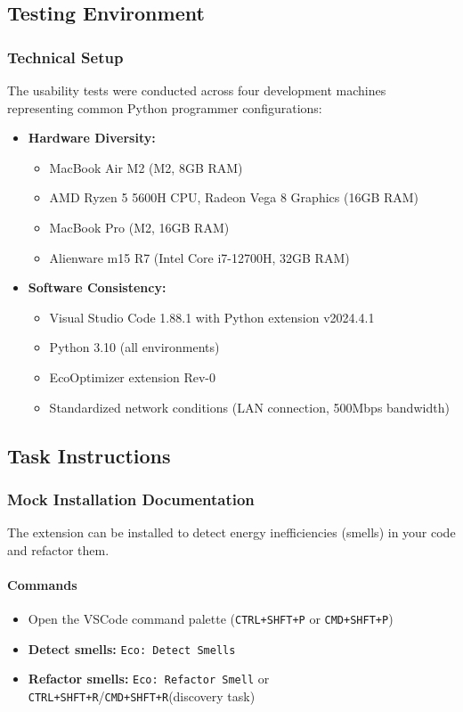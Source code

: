 \documentclass{article}
\begin{document}
\subsection{Testing Environment}
\subsubsection{Technical Setup}
The usability tests were conducted across four development machines representing common Python programmer configurations:

\begin{itemize}
    \item \textbf{Hardware Diversity:}
    \begin{itemize}
        \item MacBook Air M2 (M2, 8GB RAM)
        \item AMD Ryzen 5 5600H CPU, Radeon Vega 8 Graphics (16GB RAM)
        \item MacBook Pro (M2, 16GB RAM)
        \item Alienware m15 R7 (Intel Core i7-12700H, 32GB RAM)
    \end{itemize}
    
    \item \textbf{Software Consistency:}
    \begin{itemize}
        \item Visual Studio Code 1.88.1 with Python extension v2024.4.1
        \item Python 3.10 (all environments)
        \item EcoOptimizer extension Rev-0
        \item Standardized network conditions (LAN connection, 500Mbps bandwidth)
    \end{itemize}
\end{itemize}

\subsection{Task Instructions}
\label{subsec:tasks}

\subsubsection{Mock Installation Documentation}
The extension can be installed to detect energy inefficiencies (smells) in your code and refactor them.

\paragraph{Commands}
\begin{itemize}
    \item Open the VSCode command palette (\texttt{CTRL+SHFT+P} or \texttt{CMD+SHFT+P})
    \item \textbf{Detect smells:} \texttt{Eco: Detect Smells}
    \item \textbf{Refactor smells:} \texttt{Eco: Refactor Smell} or \texttt{CTRL+SHFT+R}/\texttt{CMD+SHFT+R}(discovery task)
\end{itemize}
\end{document}
